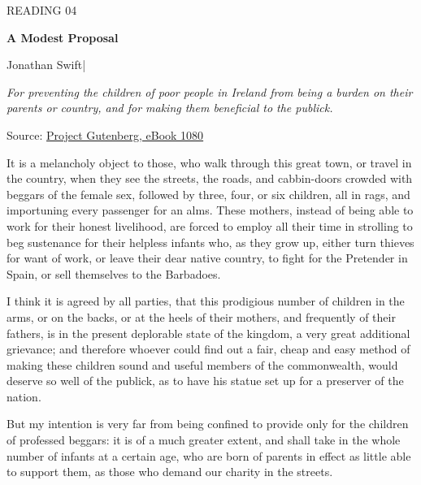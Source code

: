\begingroup

\thispagestyle{fancy}
\label{article-04}
\begingroup\raggedright
\setlength{\parindent}{0pt}
{\fontsize{9}{12}\selectfont\color{headgrey}READING 04\par}
\vspace{4pt}
{\fontsize{24}{30}\selectfont\bfseries A Modest Proposal\par}
\vspace{7pt}
{\fontsize{12}{18}\selectfont Jonathan Swift\quad|\par}
\vspace{4pt}
{\fontsize{11}{16}\selectfont\itshape For preventing the children of poor people in Ireland from being a burden on their parents or country, and for making them beneficial to the publick.\par}
\vspace{4pt}
{\fontsize{9}{12.5}\selectfont\color{headgrey}Source: \href{https://www.gutenberg.org/ebooks/1080}{Project Gutenberg, eBook 1080}\par}
\endgroup
\vspace{6pt}

It is a melancholy object to those, who walk through this great town, or travel in the country, when they see the streets, the roads, and cabbin-doors crowded with beggars of the female sex, followed by three, four, or six children, all in rags, and importuning every passenger for an alms. These mothers, instead of being able to work for their honest livelihood, are forced to employ all their time in strolling to beg sustenance for their helpless infants who, as they grow up, either turn thieves for want of work, or leave their dear native country, to fight for the Pretender in Spain, or sell themselves to the Barbadoes.\par

I think it is agreed by all parties, that this prodigious number of children in the arms, or on the backs, or at the heels of their mothers, and frequently of their fathers, is in the present deplorable state of the kingdom, a very great additional grievance; and therefore whoever could find out a fair, cheap and easy method of making these children sound and useful members of the commonwealth, would deserve so well of the publick, as to have his statue set up for a preserver of the nation.\par

But my intention is very far from being confined to provide only for the children of professed beggars: it is of a much greater extent, and shall take in the whole number of infants at a certain age, who are born of parents in effect as little able to support them, as those who demand our charity in the streets.\par

